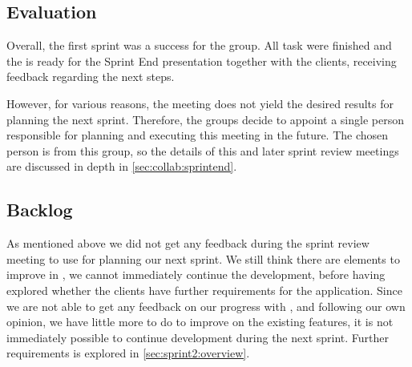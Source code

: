 
\subsection{Evaluation}
Overall, the first sprint was a success for the group.
All task were finished and the \launcher is ready for the Sprint End presentation together with the clients, receiving feedback regarding the next steps.

However, for various reasons, the meeting does not yield the desired results for planning the next sprint.
Therefore, the groups decide to appoint a single person responsible for planning and executing this meeting in the future.
The chosen person is from this group, so the details of this and later sprint review meetings are discussed in depth in \cref{sec:collab:sprintend}.

\subsection{Backlog}
As mentioned above we did not get any feedback during the sprint review meeting to use for planning our next sprint.
We still think there are elements to improve in \launcher, we cannot immediately continue the development, before having explored whether the clients have further requirements for the application.
Since we are not able to get any feedback on our progress with \launcher, and following our own opinion, we have little more to do to improve on the existing features, it is not immediately possible to continue development during the next sprint. Further requirements is explored in \cref{sec:sprint2:overview}.